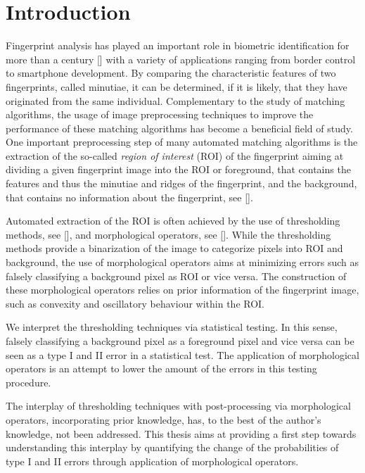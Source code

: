 \documentclass[a4paper,12pt]{article}
\theoremstyle{plain}
\theoremstyle{definition}
\begin{document}
\newpage

\section{Introduction}\label{section: introduction}

Fingerprint analysis has played an important role in biometric identification for more than a century [] with a variety of applications ranging from border control to smartphone development. By comparing the characteristic features of two fingerprints, called minutiae, it can be determined, if it is likely, that they have originated from the same individual. Complementary to the study of matching algorithms, the usage of image preprocessing techniques to improve the performance of these matching algorithms has become a beneficial field of study. One important preprocessing step of many automated matching algorithms is the extraction of the so-called \emph{region of interest} (ROI) of the fingerprint aiming at dividing a given fingerprint image into the ROI or foreground, that contains the features and thus the minutiae and ridges of the fingerprint, and the background, that contains no information about the fingerprint, see [].

Automated extraction of the ROI is often achieved by the use of thresholding methods, see [], and morphological operators, see []. While the thresholding methods provide a binarization of the image to categorize pixels into ROI and background, the use of morphological operators aims at minimizing errors such as falsely classifying a background pixel as ROI or vice versa. The construction of these morphological operators relies on prior information of the fingerprint image, such as convexity and oscillatory behaviour within the ROI.

We interpret the thresholding techniques via statistical testing. In this sense, falsely classifying a background pixel as a foreground pixel and vice versa can be seen as a type I and II error in a statistical test. The application of morphological operators is an attempt to lower the amount of the errors in this testing procedure.

The interplay of thresholding techniques with post-processing via morphological operators, incorporating prior knowledge, has, to the best of the author's knowledge, not been addressed. This thesis aims at providing a first step towards understanding this interplay by quantifying the change of the probabilities of type I and II errors through application of morphological operators.
\end{document}
